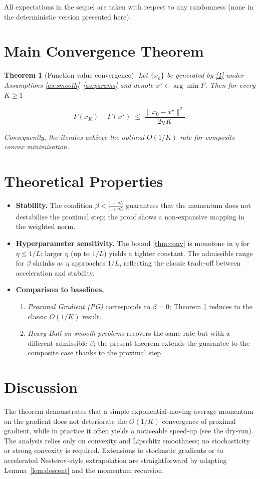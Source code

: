 \documentclass{article}
\newtheorem{theorem}{Theorem}
\begin{document}
All expectations in the sequel are taken with respect to any randomness (none in the deterministic version presented here).

\section*{Main Convergence Theorem}
\begin{theorem}[Function value convergence]\label{thm:conv}
Let $\{x_k\}$ be generated by \eqref{1} under Assumptions \ref{as:smooth}–\ref{as:params} and denote $x^{\star}\in\arg\min F$. Then for every $K\ge 1$

\[
F(x_{K})-F(x^{\star})\;\le\;\frac{\|x_{0}-x^{\star}\|^{2}}{2\eta\,K}.
\tag{2}
\]

Consequently, the iterates achieve the optimal $O(1/K)$ rate for composite convex minimisation.
\end{theorem}

\section*{Theoretical Properties}
\begin{itemize}
    \item \textbf{Stability.} The condition $\beta<\frac{1-\eta L}{1+\eta L}$ guarantees that the momentum does not destabilise the proximal step; the proof shows a non‑expansive mapping in the weighted norm.
    \item \textbf{Hyperparameter sensitivity.} The bound \eqref{thm:conv} is monotone in $\eta$ for $\eta\le1/L$; larger $\eta$ (up to $1/L$) yields a tighter constant. The admissible range for $\beta$ shrinks as $\eta$ approaches $1/L$, reflecting the classic trade‑off between acceleration and stability.
    \item \textbf{Comparison to baselines.}
    \begin{enumerate}
        \item \emph{Proximal Gradient (PG)} corresponds to $\beta=0$; Theorem \ref{thm:conv} reduces to the classic $O(1/K)$ result.
        \item \emph{Heavy‑Ball on smooth problems} recovers the same rate but with a different admissible $\beta$; the present theorem extends the guarantee to the composite case thanks to the proximal step.
    \end{enumerate}
\end{itemize}

\section*{Discussion}
The theorem demonstrates that a simple exponential‑moving‑average momentum on the gradient does not deteriorate the $O(1/K)$ convergence of proximal gradient, while in practice it often yields a noticeable speed‑up (see the dry‑run). The analysis relies only on convexity and Lipschitz smoothness; no stochasticity or strong convexity is required. Extensions to stochastic gradients or to accelerated Nesterov‑style extrapolation are straightforward by adapting Lemma~\ref{lem:descent} and the momentum recursion.
\end{document}

